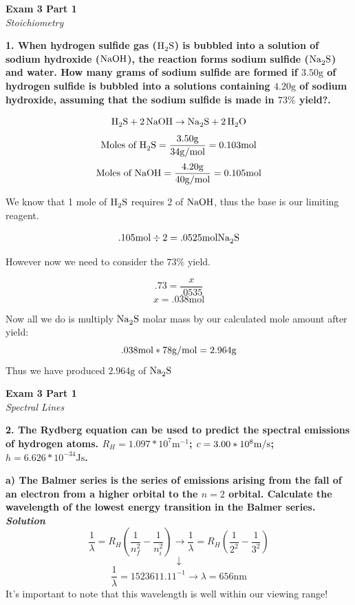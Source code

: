 \documentclass{article}
\begin{document}
    \begin{center}
        \textbf{Exam 3 Part 1}\\
        \textit{Stoichiometry}
    \end{center}
    \textbf{1. When hydrogen sulfide gas ($\ce{H2S}$) is bubbled into a solution of sodium hydroxide ($\ce{NaOH}$), the reaction forms sodium sulfide ($\ce{Na2S}$) and water. How many grams of sodium sulfide are formed if $3.50 \si{\gram}$ of hydrogen sulfide is bubbled into a solutions containing $4.20 \si{\gram}$ of sodium hydroxide, assuming that the sodium sulfide is made in $73\%$ yield?.}

    $$\ce{H2S} + \ce{2NaOH} \rightarrow \ce{Na2S} + \ce{2H2O}$$
    $$\text{Moles of \ce{H2S}} = \dfrac{3.50 \si{\gram}}{34 \si[per-mode=symbol]{\gram\per\mole}} = 0.103 \si{\mol}$$
    $$\text{Moles of \ce{NaOH}} = \dfrac{4.20 \si{\gram}}{40 \si[per-mode=symbol]{\gram\per\mole}} = 0.105 \si{\mol}$$

    We know that 1 mole of $\ce{H2S}$ requires 2 of $\ce{NaOH}$, thus the base is our limiting reagent.

    $$.105 \si{\mol} \div 2 =  .0525 \si{\mol} \ce{Na2S}$$

    However now we need to consider the $73 \%$ yield.

    $$.73 = \dfrac{x}{.0535}$$
    $$x = .038 \si{\mol} $$

    Now all we do is multiply $\ce{Na2S}$ molar mass by our calculated mole amount after yield:
    $$.038 \si{\mol} * 78 \si[per-mode=symbol]{\gram\per\mole} = 2.964 \si{\gram} $$
    Thus we have produced $ 2.964 \si{\gram}$ of $\ce{Na2S}$
    \pagebreak

    \begin{center}
        \textbf{Exam 3 Part 1}\\
        \textit{Spectral Lines}
    \end{center}
    \textbf{2. The Rydberg equation can be used to predict the spectral emissions of hydrogen atoms. $R_{H} = 1.097 * 10^{7}  \si{\meter^{-1}}$; $c = 3.00 * 10^{8} \si[per-mode=symbol]{\meter\per\second}$; $h = 6.626 * 10^{-34} \si{\joule} \si{\second}$.}

    \textbf{a)  The Balmer series is the series of emissions arising from the fall of an electron from a higher orbital to the $n = 2$ orbital. Calculate the wavelength of the lowest energy transition in the Balmer series.}\\
    \textbf{\textit{Solution}}
    $$\dfrac{1}{\lambda} = R_{H}(\dfrac{1}{n^{2}_{f}} - \dfrac{1}{n^{2}_{i}}) \rightarrow \dfrac{1}{\lambda} = R_{H}(\dfrac{1}{2^{2}} - \dfrac{1}{3^{2}})$$
    $$\downarrow$$
    $$\dfrac{1}{\lambda} = 1523611.11^{-1} \rightarrow \lambda = 656 \si{\nano\metre}$$
    It's important to note that this wavelength is well within our viewing range!
\end{document}
